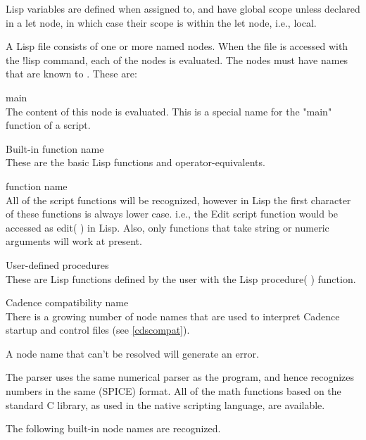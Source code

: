 Lisp variables are defined when assigned to, and have global scope
unless declared in a {\vt let} node, in which case their scope is
within the {\vt let} node, i.e., local.

A Lisp file consists of one or more named nodes.  When the file is
accessed with the {\cb !lisp} command, each of the nodes is evaluated. 
The nodes must have names that are known to {\Xic}.  These are:

\begin{description}
\item{\vt main}\\
The content of this node is evaluated.  This is a special name for the
"main" function of a script.
\item{Built-in function name}\\
These are the basic Lisp functions and operator-equivalents.
\item{{\Xic} function name}\\
All of the {\Xic} script functions will be recognized, however in Lisp
the first character of these functions is always lower case.  i.e.,
the {\vt Edit} script function would be accessed as {\vt edit}( ) in
Lisp.  Also, only {\Xic} functions that take string or numeric
arguments will work at present.
\item{User-defined procedures}\\
These are Lisp functions defined by the user with the Lisp {\vt
procedure}( ) function.
\item{Cadence compatibility name}\\
There is a growing number of node names that are used to interpret
Cadence startup and control files (see \ref{cdscompat}).
\end{description}

A node name that can't be resolved will generate an error.

The parser uses the same numerical parser as the {\WRspice} program,
and hence recognizes numbers in the same (SPICE) format.  All of the
math functions based on the standard C library, as used in the native
scripting language, are available.

The following built-in node names are recognized.

